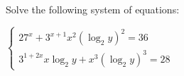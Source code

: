Solve the following system of equations:

$\begin{cases}27^x +3^{x+1}x^2 (\log_2 y)^2=36\\3^{1+2x}x\log_2 y +x^3 (\log_2 y)^3=28\end{cases}$
